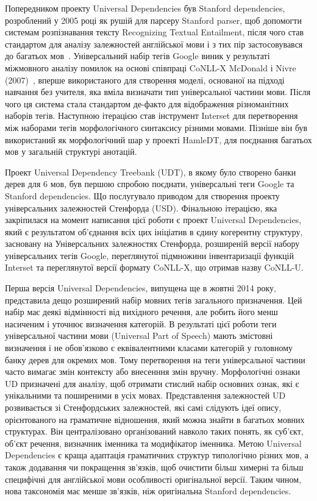 Попередником проекту Universal Dependencies був Stanford dependencies, розроблений
у 2005 році як рушій для парсеру Stanford parser, щоб допомогти системам
розпізнавання тексту Recognizing Textual Entailment, після чого став стандартом
для аналізу залежностей англійської мови і з тих пір застосовувався до багатьох
мов~\cite{bib9}. Універсальний набір тегів Google виник у результаті міжмовного
аналізу помилок на основі співпраці CoNLL-X McDonald і Nivre (2007)~\cite{bib10},
вперше використаного для створення моделі, основаної на підході навчання без
учителя, яка вміла визначати тип універсальної частини мови. Після чого ця система
стала стандартом де-факто для відображення різноманітних наборів тегів. Наступною
ітерацією став інструмент Interset для перетворення між наборами тегів
морфологічного синтаксису різними мовами. Пізніше він був використаний як
морфологічний шар у проекті HamleDT, для поєднання багатьох мов у загальній
структурі анотацій.

Проект Universal Dependency Treebank (UDT), в якому було створено банки дерев для
6 мов, був першою спробою поєднати, універсальні теги Google та Stanford
dependencies. Що послугувало приводом для створення проекту універсальних
залежностей Стенфорда (USD). Фінальною ітерацією, яка закріпилася на момент
написання цієї роботи є проект Universal Dependencies, який є результатом
об’єднання всіх цих ініціатив в єдину когерентну структуру, засновану на
Універсальних залежностях Стенфорда, розширеній версії набору універсальних тегів
Google, переглянутої підмножини інвентаризації функцій Interset та переглянутої
версії формату CoNLL-X, що отримав назву CoNLL-U.

Перша версія Universal Dependencies, випущена ще в жовтні 2014 року, представила
дещо розширений набір мовних тегів загального призначення. Цей набір має деякі
відмінності від вихідного речення, але робить його менш насиченим і уточнює
визначення категорій. В результаті цієї роботи теги універсальної частини мови
(Universal Part of Speech) мають змістовні визначення і не обов'язково є
еквівалентними класами категорій у головному банку дерев для окремих мов. Тому
перетворення на теги універсальної частини часто вимагає змін контексту або
внесенння змін вручну. Морфологічні ознаки UD призначені для аналізу, щоб отримати
стислий набір основних ознак, які є унікальними та поширеними в усіх мовах.
Представлення залежностей UD розвивається зі Стенфордських залежностей, які самі
слідують ідеї опису, орієнтованого на граматичне відношення, який можна знайти в
багатьох мовних структурах. Він централізовано організований навколо таких понять,
як суб’єкт, об’єкт речення, визначник іменника та модифікатор іменника. Метою
Universal Dependencies є краща адаптація граматичних структур типологічно різних
мов, а також додавання чи покращення зв’язків, щоб очистити більш химерні та більш
специфічні для англійської мови особливості оригінальної версії. Таким чином, нова
таксономія має менше зв’язків, ніж оригінальна Stanford dependencies.

